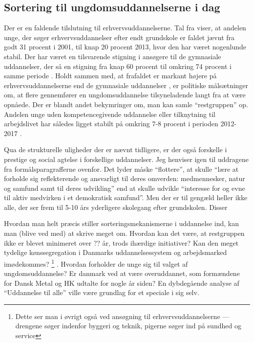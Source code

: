 \subsection{Sortering til ungdomsuddannelserne i dag}
\label{sec:sorting}
Der er en faldende tilslutning til erhvervsuddannelserne.
Tal fra \citeauthor{borne-ogundervisningsministerietSogning} viser, at andelen unge, der søger erhvervsuddannelser efter endt grundskole er faldet jævnt fra godt 31 procent i 2001, til knap 20 procent 2013, hvor den har været nogenlunde stabil.
Der har været en tilsvarende stigning i ansøgere til de gymnasiale uddannelser, der så en stigning fra knap 60 procent til omkring 74 procent i samme periode \autocite{borne-ogundervisningsministerietSogning}.
Holdt sammen med, at frafaldet er markant højere på erhvervsuddannelserne end de gymnasiale uddannelser \autocite{danskegymnasierFuldforelseOgKarakterer2019}, er politiske målsætninger om, at flere gennemfører en ungdomsuddannelse tilsyneladende langt fra at være opnåede.
Der er blandt andet bekymringer om, man kan samle “restgruppen” op.
Andelen unge uden kompetencegivende uddannelse eller tilknytning til arbejdslivet har således ligget stabilt på omkring 7-8 procent i perioden 2012-2017 \autocite[s. 9]{andersenUngeUdenUddannelse2019}.

Qua de strukturelle uligheder der er nævnt tidligere, er der også forskelle i prestige og social agtelse i forskellige uddannelser.
Jeg henviser igen til uddragene fra formålsparagrafferne ovenfor.
Det lyder måske “flottere”, at skulle “lære at forholde sig reflekterende og ansvarligt til deres omverden: medmennesker, natur og samfund samt til deres udvikling” end at skulle udvikle “interesse for og evne til aktiv medvirken i et demokratisk samfund”.
Men der er til gengæld heller ikke alle, der ser frem til 5-10 års yderligere skolegang efter grundskolen.
Disser 


Hvordan man helt præcis stiller sorteringsmekanismerne i uddannelse ind, kan man (blive ved med) at skrive meget om.
Hvordan kan det være, at restgruppen ikke er blevet minimeret over ?? år, trods ihærdige initiativer?
Kan den meget tydelige kønssegregation i Danmarks uddannelsessystem og arbejdsmarked imødekommes?
\footnote{Dette ser man i øvrigt også ved ansøgning til erhvervsuddannelserne — drengene søger indenfor byggeri og teknik, pigerne søger ind på sundhed og service} .
Hvordan forholder de unge sig til valget af ungdomsuddannelse?
Er danmark ved at være overuddannet, som formændene for Dansk Metal og HK udtalte for nogle år siden? \autocite{simonsenLadOsGore2016}
En dybdegående analyse af “Uddannelse til alle” ville være grundlag for et speciale i sig selv.

